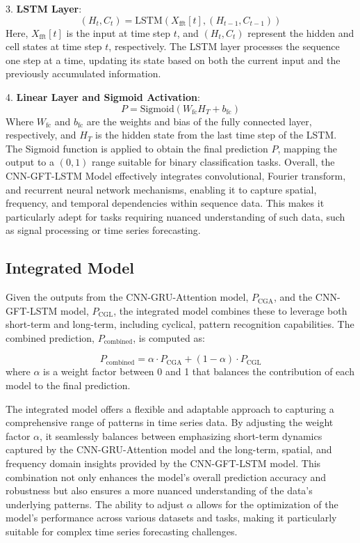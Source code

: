 \documentclass{mcmthesis}
\begin{document}
3. \textbf{LSTM Layer}:
\begin{equation}
    (H_t, C_t) = \text{LSTM}(X_{\text{fft}}[t], (H_{t-1}, C_{t-1}))
\end{equation}
Here, $X_{\text{fft}}[t]$ is the input at time step $t$, and $(H_t, C_t)$ represent the hidden and cell states at time step $t$, %
respectively. The LSTM layer processes the sequence one step at a time, updating its state based on both the current input and the %
previously accumulated information.

4. \textbf{Linear Layer and Sigmoid Activation}:
\begin{equation}
    P = \text{Sigmoid}(W_{\text{fc}}H_T + b_{\text{fc}})
\end{equation}
Where $W_{\text{fc}}$ and $b_{\text{fc}}$ are the weights and bias of the fully connected layer, respectively, %
and $H_T$ is the hidden state from the last time step of the LSTM. The Sigmoid function is applied to obtain the final prediction $P$, %
mapping the output to a $(0, 1)$ range suitable for binary classification tasks.
Overall, the CNN-GFT-LSTM Model effectively integrates convolutional, Fourier transform, and recurrent neural network mechanisms, %
enabling it to capture spatial, frequency, and temporal dependencies within sequence data. This makes it particularly adept for %
tasks requiring nuanced understanding of such data, such as signal processing or time series forecasting.



\subsection{Integrated Model}
Given the outputs from the CNN-GRU-Attention model, $P_{\text{CGA}}$, and the CNN-GFT-LSTM model, $P_{\text{CGL}}$, %
the integrated model combines these to leverage both short-term and long-term, including cyclical, pattern recognition capabilities. %
The combined prediction, $P_{\text{combined}}$, is computed as:

\begin{equation}
P_{\text{combined}} = \alpha \cdot P_{\text{CGA}} + (1 - \alpha) \cdot P_{\text{CGL}}
\end{equation}
where $\alpha$ is a weight factor between 0 and 1 that balances the contribution of each model to the final prediction.

The integrated model offers a flexible and adaptable approach to capturing a comprehensive range of patterns in time series data. %
By adjusting the weight factor $\alpha$, it seamlessly balances between emphasizing short-term dynamics captured by the CNN-GRU-Attention %
model and the long-term, spatial, and frequency domain insights provided by the CNN-GFT-LSTM model. This combination not only enhances %
the model's overall prediction accuracy and robustness but also ensures a more nuanced understanding of the data's underlying patterns. %
The ability to adjust $\alpha$ allows for the optimization of the model's performance across various datasets and tasks, making it %
particularly suitable for complex time series forecasting challenges.
\end{document}
